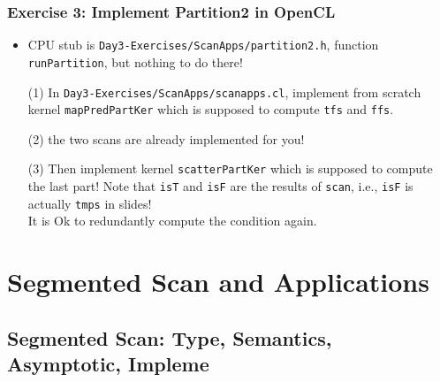 \documentclass{beamer}
\begin{document}
\begin{frame}[fragile,t]
  \frametitle{Exercise 3: Implement Partition2 in OpenCL}

\begin{itemize}
    \item CPU stub is {\tt Day3-Exercises/ScanApps/partition2.h}, 
            function {\tt runPartition}, but nothing to do there!\bigskip
    \item[(1)] In {\tt Day3-Exercises/ScanApps/scanapps.cl}, implement
             from scratch kernel {\tt mapPredPartKer} which is supposed 
             to compute {\tt tfs} and {\tt ffs}.\bigskip
    \item[(2)] the two scans are already implemented for you!\bigskip
    \item[(3)] Then implement kernel {\tt scatterPartKer} which is supposed
             to compute the last part! Note that {\tt isT} and {\tt isF}
             are the results of {\tt scan}, i.e., {\tt isF} is actually {\tt tmps}
             in slides!\\
             It is Ok to redundantly compute the condition again.
\end{itemize}

\end{frame}

\section{Segmented Scan and Applications}

\subsection{Segmented Scan: Type, Semantics, Asymptotic, Impleme}
\end{document}
